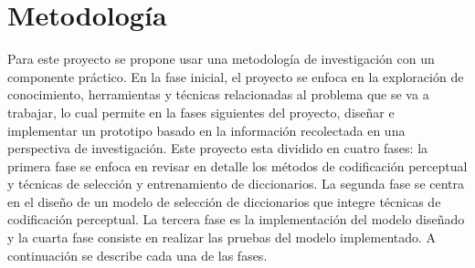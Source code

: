 \chapter{Metodolog\'ia}
\label{chap:methodology}


Para este proyecto se propone usar una metodolog\'ia de investigaci\'on con un componente pr\'actico. En la fase inicial, el proyecto se enfoca en la exploraci\'on de conocimiento, herramientas y t\'ecnicas relacionadas al problema que se va a trabajar, lo cual permite en la fases siguientes del proyecto, dise\~nar e implementar un prototipo basado en la informaci\'on recolectada en una perspectiva de investigaci\'on. Este proyecto esta dividido en cuatro fases: la primera fase se enfoca en revisar en detalle los m\'etodos de codificaci\'on perceptual y t\'ecnicas de selecci\'on y entrenamiento de diccionarios. La segunda fase se centra en el dise\~no de un modelo de selecci\'on de diccionarios que integre t\'ecnicas de codificaci\'on perceptual. La tercera fase es la implementaci\'on del modelo dise\~nado y la cuarta fase consiste en realizar las pruebas del modelo implementado.  A continuaci\'on se describe cada una de las fases.

